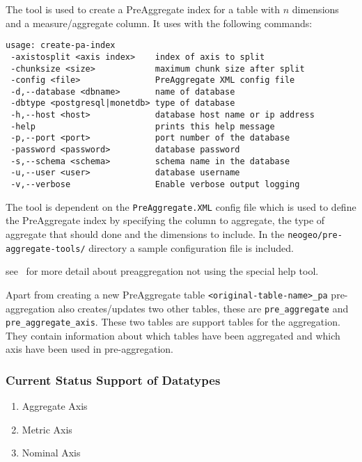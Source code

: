 The tool is used to create a PreAggregate index for a table with $\textit{n}$ dimensions and a measure/aggregate column. It uses with the following commands:
\begin{lstlisting}[basicstyle=\small]
usage: create-pa-index
 -axistosplit <axis index>    index of axis to split
 -chunksize <size>            maximum chunk size after split
 -config <file>               PreAggregate XML config file
 -d,--database <dbname>       name of database
 -dbtype <postgresql|monetdb> type of database
 -h,--host <host>             database host name or ip address
 -help                        prints this help message
 -p,--port <port>             port number of the database
 -password <password>         database password
 -s,--schema <schema>         schema name in the database
 -u,--user <user>             database username
 -v,--verbose                 Enable verbose output logging
\end{lstlisting}
The tool is dependent on the \lstinline$PreAggregate.XML$ config file which is used to define the PreAggregate index by specifying the column to aggregate, the type of aggregate that should done and the dimensions to include. In the \lstinline$neogeo/pre-aggregate-tools/$ directory a sample configuration file is included.


see~ for more detail about preaggregation not using the special help tool.

Apart from creating a new PreAggregate table \lstinline$<original-table-name>_pa$ pre-aggregation also creates/updates two other tables, these are \lstinline$pre_aggregate$ and \lstinline$pre_aggregate_axis$. These two tables are support tables for the aggregation. They contain information about which tables have been aggregated and which axis have been used in pre-aggregation.
\subsubsection{Current Status Support of Datatypes}
\begin{enumerate}
	\item Aggregate Axis
	\item Metric Axis
	\item Nominal Axis
\end{enumerate}


